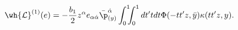 \begin{equation}
\wh{\mathcal{L}}^{(1)}(e)=-\frac{b_1}{2}z^\alpha e_{\alpha\dot{\alpha}}
\bar{\p}_{(y)}^{\dot{\alpha}}\int_0^1\!\!\!\int_0^1 dt'tdt\Phi(-tt'z,\bar{y})
\kappa(tt'z,y).
\end{equation}

